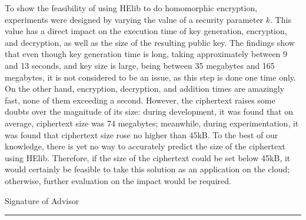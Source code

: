 To show the feasibility of using HElib to do homomorphic encryption, experiments were designed by varying the value of a security parameter $k$. This value has a direct impact on the execution time of key generation, encryption, and decryption, as well as the size of the resulting public key. The findings show that even though key generation time is long, taking approximately between 9 and 13 seconds, and key size is large, being between 35 megabytes and 165 megabytes, it is not considered to be an issue, as this step is done one time only. On the other hand, encryption, decryption, and addition times are amazingly fast, none of them exceeding a second. However, the ciphertext raises some doubts over the magnitude of its size: during development, it was found that on average, ciphertext size was 74 megabytes; meanwhile, during experimentation, it was found that ciphertext size rose no higher than 45kB. To the best of our knowledge, there is yet no way to accurately predict the size of the ciphertext using HElib. Therefore, if the size of the ciphertext could be set below 45kB, it would certainly be feasible to take this solution as an application on the cloud; otherwise, further evaluation on the impact would be required.

\noindent Signature of Advisor \rule{72mm}{0.3pt}

\vspace*{-4mm}

\noindent \phantom{Advisor signature: m} \asesor
